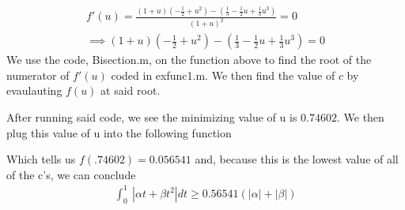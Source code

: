 \documentclass[11pt]{SelfArxOneColBMN}
\begin{document}
\begin{solution}
\begin{enumerate}
    \begin{eqnarray*}
      f'(u) = \frac{(1 + u)(-\frac{1}{2} + u^2) - (\frac{1}{3} - \frac{1}{2}u + \frac{1}{3}u^3)}{(1 + u)^2} = 0\\
      \implies (1 + u)(-\frac{1}{2} + u^2) - (\frac{1}{3} - \frac{1}{2}u + \frac{1}{3}u^3) = 0
    \end{eqnarray*}
    We use the code, Bisection.m, on the function above to find the root of the numerator of $f'(u)$ coded in exfunc1.m. We then find the value of $c$ by evaulauting $f(u)$ at said root.\\
    \newpage
    \singlespacing
    
    \onehalfspacing

    \singlespacing
    
    \onehalfspacing

    After running said code, we see the minimizing value of u is $0.74602$. We then plug this value of u into the following function  
    \singlespacing
    
    \onehalfspacing

    Which tells us $f(.74602) = 0.056541$ and, because this is the lowest value of all of the c's, we can conclude
    \begin{eqnarray*}
      \int_0^1 \: | \alpha t + \beta t^2| dt \geq 0.56541( |\alpha| + |\beta|)
    \end{eqnarray*}
  \end{enumerate}
\end{solution}
\end{document}
